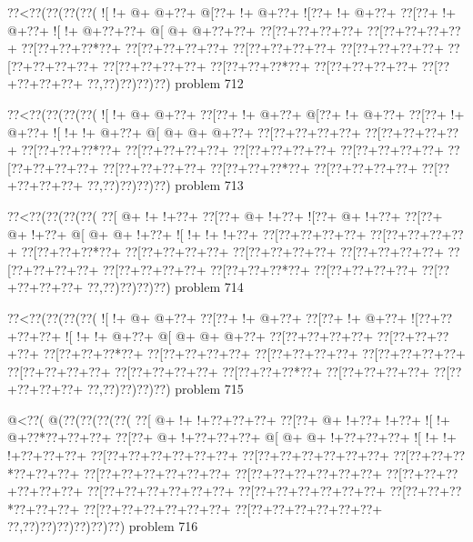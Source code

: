 \vbox{\vbox{\goo
\0??<\0??(\0??(\0??(\0??(
\- ![\- !+\- @+\- @+\0??+
\- @[\0??+\- !+\- @+\0??+
\- ![\0??+\- !+\- @+\0??+
\0??[\0??+\- !+\- @+\0??+
\- ![\- !+\- @+\0??+\0??+
\- @[\- @+\- @+\0??+\0??+
\0??[\0??+\0??+\0??+\0??+
\0??[\0??+\0??+\0??+\0??+
\0??[\0??+\0??+\0??*\0??+
\0??[\0??+\0??+\0??+\0??+
\0??[\0??+\0??+\0??+\0??+
\0??[\0??+\0??+\0??+\0??+
\0??[\0??+\0??+\0??+\0??+
\0??[\0??+\0??+\0??+\0??+
\0??[\0??+\0??+\0??*\0??+
\0??[\0??+\0??+\0??+\0??+
\0??[\0??+\0??+\0??+\0??+
\0??,\0??)\0??)\0??)\0??)
}
\hfil problem 712\hfil\break
}

\vbox{\vbox{\goo
\0??<\0??(\0??(\0??(\0??(
\- ![\- !+\- @+\- @+\0??+
\0??[\0??+\- !+\- @+\0??+
\- @[\0??+\- !+\- @+\0??+
\0??[\0??+\- !+\- @+\0??+
\- ![\- !+\- !+\- @+\0??+
\- @[\- @+\- @+\- @+\0??+
\0??[\0??+\0??+\0??+\0??+
\0??[\0??+\0??+\0??+\0??+
\0??[\0??+\0??+\0??*\0??+
\0??[\0??+\0??+\0??+\0??+
\0??[\0??+\0??+\0??+\0??+
\0??[\0??+\0??+\0??+\0??+
\0??[\0??+\0??+\0??+\0??+
\0??[\0??+\0??+\0??+\0??+
\0??[\0??+\0??+\0??*\0??+
\0??[\0??+\0??+\0??+\0??+
\0??[\0??+\0??+\0??+\0??+
\0??,\0??)\0??)\0??)\0??)
}
\hfil problem 713\hfil\break
}

\vbox{\vbox{\goo
\0??<\0??(\0??(\0??(\0??(
\0??[\- @+\- !+\- !+\0??+
\0??[\0??+\- @+\- !+\0??+
\- ![\0??+\- @+\- !+\0??+
\0??[\0??+\- @+\- !+\0??+
\- @[\- @+\- @+\- !+\0??+
\- ![\- !+\- !+\- !+\0??+
\0??[\0??+\0??+\0??+\0??+
\0??[\0??+\0??+\0??+\0??+
\0??[\0??+\0??+\0??*\0??+
\0??[\0??+\0??+\0??+\0??+
\0??[\0??+\0??+\0??+\0??+
\0??[\0??+\0??+\0??+\0??+
\0??[\0??+\0??+\0??+\0??+
\0??[\0??+\0??+\0??+\0??+
\0??[\0??+\0??+\0??*\0??+
\0??[\0??+\0??+\0??+\0??+
\0??[\0??+\0??+\0??+\0??+
\0??,\0??)\0??)\0??)\0??)
}
\hfil problem 714\hfil\break
}

\vbox{\vbox{\goo
\0??<\0??(\0??(\0??(\0??(
\- ![\- !+\- @+\- @+\0??+
\0??[\0??+\- !+\- @+\0??+
\0??[\0??+\- !+\- @+\0??+
\- ![\0??+\0??+\0??+\0??+
\- ![\- !+\- !+\- @+\0??+
\- @[\- @+\- @+\- @+\0??+
\0??[\0??+\0??+\0??+\0??+
\0??[\0??+\0??+\0??+\0??+
\0??[\0??+\0??+\0??*\0??+
\0??[\0??+\0??+\0??+\0??+
\0??[\0??+\0??+\0??+\0??+
\0??[\0??+\0??+\0??+\0??+
\0??[\0??+\0??+\0??+\0??+
\0??[\0??+\0??+\0??+\0??+
\0??[\0??+\0??+\0??*\0??+
\0??[\0??+\0??+\0??+\0??+
\0??[\0??+\0??+\0??+\0??+
\0??,\0??)\0??)\0??)\0??)
}
\hfil problem 715\hfil\break
}

\vbox{\vbox{\goo
\- @<\0??(\- @(\0??(\0??(\0??(\0??(
\0??[\- @+\- !+\- !+\0??+\0??+\0??+
\0??[\0??+\- @+\- !+\0??+\- !+\0??+
\- ![\- !+\- @+\0??*\0??+\0??+\0??+
\0??[\0??+\- @+\- !+\0??+\0??+\0??+
\- @[\- @+\- @+\- !+\0??+\0??+\0??+
\- ![\- !+\- !+\- !+\0??+\0??+\0??+
\0??[\0??+\0??+\0??+\0??+\0??+\0??+
\0??[\0??+\0??+\0??+\0??+\0??+\0??+
\0??[\0??+\0??+\0??*\0??+\0??+\0??+
\0??[\0??+\0??+\0??+\0??+\0??+\0??+
\0??[\0??+\0??+\0??+\0??+\0??+\0??+
\0??[\0??+\0??+\0??+\0??+\0??+\0??+
\0??[\0??+\0??+\0??+\0??+\0??+\0??+
\0??[\0??+\0??+\0??+\0??+\0??+\0??+
\0??[\0??+\0??+\0??*\0??+\0??+\0??+
\0??[\0??+\0??+\0??+\0??+\0??+\0??+
\0??[\0??+\0??+\0??+\0??+\0??+\0??+
\0??,\0??)\0??)\0??)\0??)\0??)\0??)
}
\hfil problem 716\hfil\break
}

